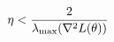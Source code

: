 \documentclass[preview]{standalone}
\begin{document}
\begin{align*}
\special{dvisvgm:raw <g id='unique000'>}\eta < \frac{2}{\lambda_{\max}(\nabla^2 L(\theta))}\special{dvisvgm:raw </g>}
\end{align*}
\end{document}
